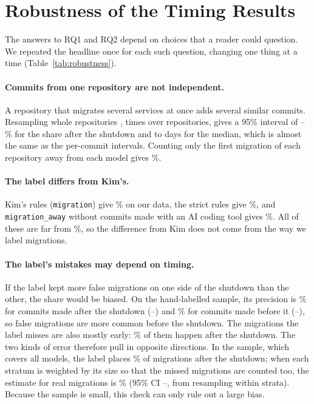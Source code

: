 \section{Robustness of the Timing Results}\label{sec:robustness}

The answers to RQ1 and RQ2 depend on choices that a reader could question. We repeated the headline once for each such question, changing one thing at a time (Table~\ref{tab:robustness}).

\paragraph{Commits from one repository are not independent.} A repository that migrates several services at once adds several similar commits. Resampling whole repositories \citep{efron1993bootstrap}, \BootReps{} times over \BootRepos{} repositories, gives a 95\% interval of \AfterLateRepoLow--\AfterLateRepoHigh\% for the share after the shutdown and \ExactDaysRepoLow{} to \ExactDaysRepoHigh{} days for the median, which is almost the same as the per-commit intervals. Counting only the first migration of each repository away from each model gives \AfterFirst\%.

\paragraph{The label differs from Kim's.} Kim's rules (\texttt{migration}) give \AfterKimLabel\% on our data, the strict rules give \AfterStrict\%, and \texttt{migration\_away} without commits made with an AI coding tool gives \AfterNoAI\%. All of these are far from \KimAfterShutdown\%, so the difference from Kim does not come from the way we label migrations.

\paragraph{The label's mistakes may depend on timing.} If the label kept more false migrations on one side of the shutdown than the other, the share would be biased. On the hand-labelled sample, its precision is \PrecisionAfter\% for commits made after the shutdown (\PrecisionAfterLow--\PrecisionAfterHigh) and \PrecisionBefore\% for commits made before it (\PrecisionBeforeLow--\PrecisionBeforeHigh), so false migrations are more common before the shutdown. The migrations the label misses are also mostly early: \SampleMissedAfter\% of them happen after the shutdown. The two kinds of error therefore pull in opposite directions. In the sample, which covers all models, the label places \SampleLabelAfter\% of migrations after the shutdown; when each stratum is weighted by its size so that the missed migrations are counted too, the estimate for real migrations is \SampleTrueAfter\% (95\% CI \SampleTrueAfterLow--\SampleTrueAfterHigh, from resampling within strata). Because the sample is small, this check can only rule out a large bias.

